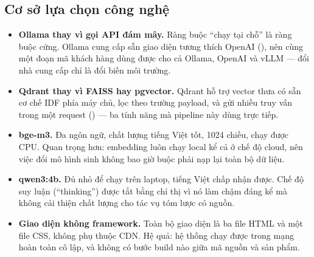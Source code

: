 \subsection{Cơ sở lựa chọn công nghệ}

\begin{itemize}
  \item \textbf{Ollama thay vì gọi API đám mây.} Ràng buộc “chạy tại chỗ” là ràng buộc cứng.
  Ollama cung cấp sẵn giao diện tương thích OpenAI \cite{ollama}
  (), nên cùng một đoạn mã khách hàng dùng được cho cả Ollama,
  OpenAI và vLLM — đổi nhà cung cấp chỉ là đổi biến môi trường.
  \item \textbf{Qdrant thay vì FAISS hay pgvector.} Qdrant hỗ trợ vector thưa có sẵn cơ chế IDF
  phía máy chủ, lọc theo trường payload, và gửi nhiều truy vấn trong một request
  () \cite{qdrant} — ba tính năng mà pipeline này dùng trực tiếp.
  \item \textbf{bge-m3.} Đa ngôn ngữ, chất lượng tiếng Việt tốt, 1024 chiều, chạy được CPU.
  Quan trọng hơn: embedding luôn chạy local kể cả ở chế độ cloud, nên việc đổi mô hình sinh
  không bao giờ buộc phải nạp lại toàn bộ dữ liệu.
  \item \textbf{qwen3:4b.} Đủ nhỏ để chạy trên laptop, tiếng Việt chấp nhận được. Chế độ suy
  luận (“thinking”) được tắt bằng chỉ thị  vì nó làm chậm đáng kể mà không cải
  thiện chất lượng cho tác vụ tóm lược có nguồn.
  \item \textbf{Giao diện không framework.} Toàn bộ giao diện là ba file HTML và một file CSS,
  không phụ thuộc CDN. Hệ quả: hệ thống chạy được trong mạng hoàn toàn cô lập, và không có bước
  build nào giữa mã nguồn và sản phẩm.
\end{itemize}

\chapterbreak
